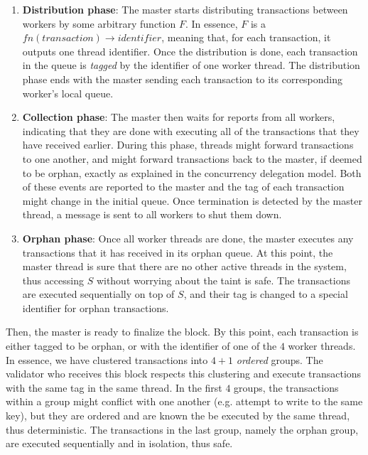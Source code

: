 \begin{enumerate}
	\item \textbf{Distribution phase}: The master starts distributing transactions between workers
	by some arbitrary function $F$. In essence, $F$ is a $fn(transaction) \rightarrow identifier$,
	meaning that, for each transaction, it outputs one thread identifier. Once the distribution is
	done, each transaction in the queue is \textit{tagged} by the identifier of one worker thread.
	The distribution phase ends with the master sending each transaction to its corresponding
	worker's local queue.

	\item \textbf{Collection phase}: The master then waits for reports from all workers, indicating
	that they are done with executing all of the transactions that they have received earlier.
	During this phase, threads might forward transactions to one another, and might forward
	transactions back to the master, if deemed to be orphan, exactly as explained in the concurrency
	delegation model. Both of these events are reported to the master and the tag of each
	transaction might change in the initial queue. Once termination is detected by the master
	thread, a message is sent to all workers to shut them down.

	\item \textbf{Orphan phase}: Once all worker threads are done, the master executes any
	transactions that it has received in its orphan queue. At this point, the master thread is sure
	that there are no other active threads in the system, thus accessing $S$ without worrying about
	the taint is safe. The transactions are executed sequentially on top of $S$, and their tag is
	changed to a special identifier for orphan transactions.
\end{enumerate}

Then, the master is ready to finalize the block. By this point, each transaction is either tagged to
be orphan, or with the identifier of one of the $4$ worker threads. In essence, we have clustered
transactions into $4 + 1$ \textit{ordered} groups. The validator who receives this block respects
this clustering and execute transactions with the same tag in the same thread. In the first $4$
groups, the transactions within a group might conflict with one another (e.g. attempt to write to
the same key), but they are ordered and are known the be executed by the same thread, thus
deterministic. The transactions in the last group, namely the orphan group, are executed
sequentially and in isolation, thus safe.

